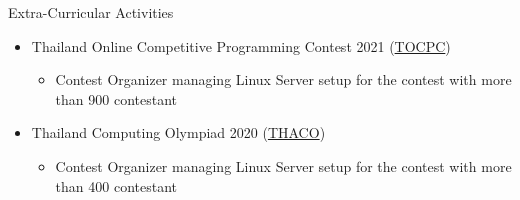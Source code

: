 \documentclass{resume} %
\begin{document}
\begin{rSection}{Extra-Curricular Activities}
    \begin{itemize}
        \item 	Thailand Online Competitive Programming Contest 2021 (\href{https://tocpc.codes}{TOCPC})
              \begin{itemize}
                  \item Contest Organizer managing Linux Server setup for the contest with more than 900 contestant
              \end{itemize}
        \item 	Thailand Computing Olympiad 2020 (\href{https://thaco.tech}{THACO})
              \begin{itemize}
                  \item Contest Organizer managing Linux Server setup for the contest with more than 400 contestant
              \end{itemize}
    \end{itemize}
\end{rSection}
\end{document}
